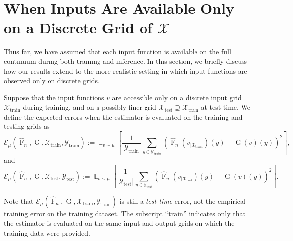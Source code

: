 \documentclass[11pt]{article}
\theoremstyle{plain}
\newcommand{\Xcal}{\mathcal{X}}
\newcommand{\Ycal}{\mathcal{Y}}
\newcommand{\Ecal}{\mathcal{E}}
\DeclareMathOperator*{\expect}{\mathbb{E}}
\begin{document}
\section{When Inputs Are Available Only on a Discrete Grid of $\Xcal$}
\label{sec:discreteX}

Thus far, we have assumed that each input function is available on the full continuum during both
training and inference. In this section, we briefly discuss how our results extend to the more
realistic setting in which input functions are observed only on discrete grids.

Suppose that the input functions $v$ are accessible only on a discrete input grid
$\Xcal_{\mathrm{train}}$ during training, and on a possibly finer grid
$\Xcal_{\mathrm{test}} \supseteq \Xcal_{\mathrm{train}}$ at test time. We define the expected errors
when the estimator is evaluated on the training and testing grids as
\[
\Ecal_{\mu}\!\left(
\widehat{\operatorname{F}}_n, \operatorname{G},
\Xcal_{\mathrm{train}}, \Ycal_{\mathrm{train}}
\right)
:=
\expect_{v \sim \mu}
\left[
\frac{1}{|\Ycal_{\mathrm{train}}|}
\sum_{y \in \Ycal_{\mathrm{train}}}
\left(
\widehat{\operatorname{F}}_n\!\left(v_{\mid \Xcal_{\mathrm{train}}}\right)(y)
-
\operatorname{G}(v)(y)
\right)^2
\right],
\]
and
\[
\Ecal_{\mu}\!\left(
\widehat{\operatorname{F}}_n, \operatorname{G},
\Xcal_{\mathrm{test}}, \Ycal_{\mathrm{test}}
\right)
:=
\expect_{v \sim \mu}
\left[
\frac{1}{|\Ycal_{\mathrm{test}}|}
\sum_{y \in \Ycal_{\mathrm{test}}}
\left(
\widehat{\operatorname{F}}_n\!\left(v_{\mid \Xcal_{\mathrm{test}}}\right)(y)
-
\operatorname{G}(v)(y)
\right)^2
\right].
\]

\noindent Note that
$\Ecal_{\mu}(\widehat{\operatorname{F}}_n, \operatorname{G}, \Xcal_{\mathrm{train}}, \Ycal_{\mathrm{train}})$
is still a \emph{test-time} error, not the empirical training error on the training dataset. The
subscript ``$\mathrm{train}$'' indicates only that the estimator is evaluated on the same input and
output grids on which the training data were provided.
\end{document}
